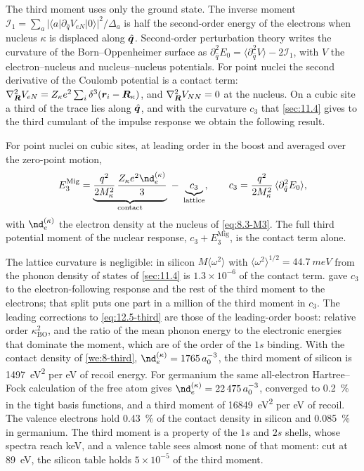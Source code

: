 The third moment uses only the ground state. The inverse moment $\mathcal{I}_1 = \sum_a|\langle a|\partial_{\hat q}V_{eN}|0\rangle|^2/\Delta_a$ is half the second-order energy of the electrons when nucleus $\kappa$ is displaced along $\hat{\bm{q}}$. Second-order perturbation theory writes the curvature of the Born--Oppenheimer surface as $\partial^2_{\hat q}E_0 = \langle\partial^2_{\hat q}V\rangle - 2\mathcal{I}_1$, with $V$ the electron--nucleus and nucleus--nucleus potentials. For point nuclei the second derivative of the Coulomb potential is a contact term: $\nabla^2_{\bm{R}}V_{eN} = Z_\kappa e^2\sum_i\delta^3(\bm{r}_i - \bm{R}_\kappa)$, and $\nabla^2_{\bm{R}}V_{NN} = 0$ at the nucleus. On a cubic site a third of the trace lies along $\hat{\bm{q}}$, and with the curvature $c_3$ that \cref{sec:11.4} gives to the third cumulant of the impulse response we obtain the following result.
\begin{keyresult}
For point nuclei on cubic sites, at leading order in the boost and averaged over the zero-point motion,
\begin{equation}
  E^{\mathrm{Mig}}_3 = \underbrace{\frac{q^2}{2M_\kappa^2}\,\frac{Z_\kappa e^2\nd_e^{(\kappa)}}{3}}_{\text{contact}} \;-\; \underbrace{c_3}_{\text{lattice}} , \qquad
  c_3 = \frac{q^2}{2M_\kappa^2}\,\langle\partial^2_{\hat q}E_0\rangle ,
  \label{eq:12.5-third}
\end{equation}
with $\nd_e^{(\kappa)}$ the electron density at the nucleus of \cref{eq:8.3-M3}. The full third potential moment of the nuclear response, $c_3 + E^{\mathrm{Mig}}_3$, is the contact term alone.
\end{keyresult}
\noindent The lattice curvature is negligible: in silicon $M\langle\omega^2\rangle$ with $\langle\omega^2\rangle^{1/2} = \SI{44.7}{meV}$ from the phonon density of states of \cref{sec:11.4} is $1.3\times10^{-6}$ of the contact term.  gave $c_3$ to the electron-following response and the rest of the third moment to the electrons; that split puts one part in a million of the third moment in $c_3$. The leading corrections to \cref{eq:12.5-third} are those of the leading-order boost: relative order $\kappa_{\mathrm{BO}}^2$, and the ratio of the mean phonon energy to the electronic energies that dominate the moment, which are of the order of the $1s$ binding. With the contact density of \cref{we:8-third}, $\nd_e^{(\kappa)} = 1765\,a_0^{-3}$, the third moment of silicon is \SI{1497}{eV^2} per eV of recoil energy. For germanium the same all-electron Hartree--Fock calculation of the free atom gives $\nd_e^{(\kappa)} = 22\,475\,a_0^{-3}$, converged to \SI{0.2}{\percent} in the tight basis functions, and a third moment of \SI{16849}{eV^2} per eV of recoil. The valence electrons hold \SI{0.43}{\percent} of the contact density in silicon and \SI{0.085}{\percent} in germanium. The third moment is a property of the $1s$ and $2s$ shells, whose spectra reach keV, and a valence table sees almost none of that moment: cut at \SI{89}{eV}, the silicon table holds $5\times10^{-5}$ of the third moment.

